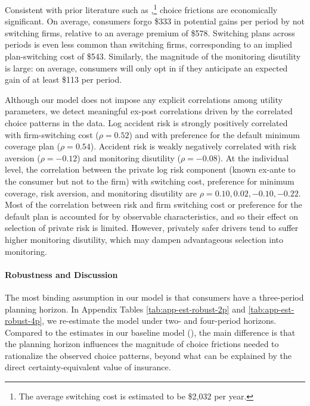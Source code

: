 Consistent with prior literature such as \textcite{Handel2013},\footnote{The average switching cost is estimated to be \$2,032 per year.} choice frictions are economically significant. On average, consumers forgo  \$333  in potential gains per period by not switching firms, relative to an average premium of \$578. Switching plans across periods is even less common than switching firms, corresponding to an implied plan-switching cost of \$543. Similarly, the magnitude of the monitoring disutility is large: on average, consumers will only opt in if they anticipate an expected gain of at least  \$113  per period.

Although our model does not impose any explicit correlations among utility parameters, we detect meaningful ex-post correlations driven by  the correlated choice patterns in the data.  Log accident risk is strongly positively correlated with firm-switching cost ($\rho =  0.52 $) and with preference for the default minimum coverage plan ($\rho =  0.54 $).  Accident risk is weakly negatively correlated with risk aversion ($\rho =  -0.12 $) and monitoring disutility ($\rho =  -0.08 $).  At the individual level, the correlation between the private log risk component (known ex-ante to the consumer but not to the firm) with switching cost, preference for minimum coverage, risk aversion, and monitoring disutility are $\rho =  0.10,  0.02,  -0.10,  -0.22$.  Most of the correlation between risk and firm switching cost or preference for the default plan is accounted for by observable characteristics, and so their effect on selection of private risk is limited. However, privately safer drivers tend to suffer higher monitoring disutility, which may dampen advantageous selection into monitoring.

\paragraph{Robustness and Discussion}

The most binding assumption in our model is that consumers have a three-period planning horizon. In Appendix Tables \ref{tab:app-est-robust-2p} and \ref{tab:app-est-robust-4p}, we re-estimate the model under two- and four-period horizons.
Compared to the estimates in our baseline model (), the main difference is that the planning horizon influences the magnitude of choice frictions needed to rationalize the observed choice patterns, beyond what can be explained by the direct certainty-equivalent value of insurance.


